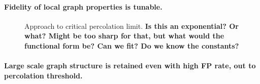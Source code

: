 \documentclass[12pt]{article} \usepackage{simplemargins}
\begin{document}
\paragraph{Fidelity of local graph properties is tunable.}

\begin{figure}
\caption{Approach to critical percolation limit. {\bf Is this an
    exponential?  Or what?  Might be too sharp for that, but what
    would the functional form be? Can we fit?  Do we know the constants?}}
\end{figure}

\paragraph{Large scale graph structure is retained even with high FP rate, out to percolation threshold.}
\end{document}
